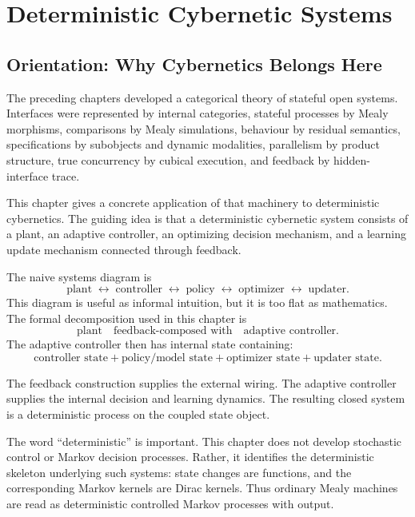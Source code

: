 \chapter{Deterministic Cybernetic Systems}
\label{chap:deterministic-cybernetics}

\section{Orientation: Why Cybernetics Belongs Here}
\label{sec:cybernetic-orientation}

The preceding chapters developed a categorical theory of stateful open systems.  Interfaces were
represented by internal categories, stateful processes by Mealy morphisms, comparisons by Mealy
simulations, behaviour by residual semantics, specifications by subobjects and dynamic modalities,
parallelism by product structure, true concurrency by cubical execution, and feedback by hidden-interface
trace.

This chapter gives a concrete application of that machinery to deterministic cybernetics.  The
guiding idea is that a deterministic cybernetic system consists of a plant, an adaptive controller,
an optimizing decision mechanism, and a learning update mechanism connected through feedback.

The naive systems diagram is
\[
\text{plant}
\;\longleftrightarrow\;
\text{controller}
\;\longleftrightarrow\;
\text{policy}
\;\longleftrightarrow\;
\text{optimizer}
\;\longleftrightarrow\;
\text{updater}.
\]
This diagram is useful as informal intuition, but it is too flat as mathematics.  The formal
decomposition used in this chapter is
\[
\boxed{
\text{plant}
\quad\text{feedback-composed with}\quad
\text{adaptive controller}.
}
\]
The adaptive controller then has internal state containing:
\[
\boxed{
\text{controller state}
+
\text{policy/model state}
+
\text{optimizer state}
+
\text{updater state}.
}
\]

The feedback construction supplies the external wiring.  The adaptive controller supplies the
internal decision and learning dynamics.  The resulting closed system is a deterministic process on
the coupled state object.

The word ``deterministic'' is important.  This chapter does not develop stochastic control or
Markov decision processes.  Rather, it identifies the deterministic skeleton underlying such systems:
state changes are functions, and the corresponding Markov kernels are Dirac kernels.  Thus ordinary
Mealy machines are read as deterministic controlled Markov processes with output.

